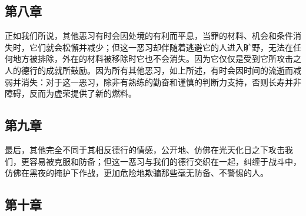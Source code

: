 \subsection{第八章}

\par

正如我们所说，其他恶习有时会因处境的有利而平息，当罪的材料、机会和条件消失时，它们就会松懈并减少；但这一恶习却伴随着逃避它的人进入旷野，无法在任何地方被排除，外在的材料被移除时它也不会消失。因为它仅仅是受到它所攻击之人的德行的成就所鼓励。因为所有其他恶习，如上所述，有时会因时间的流逝而减弱并消失：对于这一恶习，除非有熟练的勤奋和谨慎的判断力支持，否则长寿并非障碍，反而为虚荣提供了新的燃料。\par


\subsection{第九章}

\par

最后，其他完全不同于其相反德行的情感，公开地、仿佛在光天化日之下攻击我们，更容易被克服和防备；但这一恶习与我们的德行交织在一起，纠缠于战斗中，仿佛在黑夜的掩护下作战，更加危险地欺骗那些毫无防备、不警惕的人。\par


\subsection{第十章}

\par

